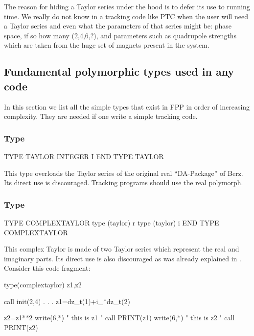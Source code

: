\documentclass[english,12pt,article]{article} %
\begin{document}
The reason for hiding a Taylor series under the hood is to defer its use to running time. We really do not know in a tracking code like PTC when the user will need a Taylor series and even what the parameters of that series might be: phase space, if so how many (2,4,6,?), and parameters such as quadrupole strengths which are taken from the huge set of magnets present in the system.


\subsection{Fundamental polymorphic types used in any code}\label{sec:funtype}

In this section we list all the simple types that exist in FPP in order of increasing complexity. They are needed if one write a simple tracking code.

\subsubsection{Type  \protect{}}

\begin{example}
  TYPE TAYLOR
     INTEGER I   
  END TYPE TAYLOR
\end{example}

This type overloads the Taylor series of the original real ``DA-Package'' of Berz. Its direct use is discouraged. Tracking programs should use the real polymorph.

\subsubsection{Type \protect{}}\label{sec:complextaylor}

\begin{example}
  TYPE COMPLEXTAYLOR
     type (taylor) r
     type (taylor) i
  END TYPE COMPLEXTAYLOR
\end{example}

This complex Taylor is made of two Taylor series which represent the real and imaginary parts. Its direct use is also  discouraged as was already explained in  .  Consider this code fragment:



\begin{code}
    type(complextaylor) z1,z2
 
    call init(2,4)
    .
    .
    .
    z1=dz_t(1)+i_*dz_t(2)

    z2=z1**2
   write(6,*) " this is z1 "
   call PRINT(z1)   
   write(6,*) " this is z2 "
   call PRINT(z2)	
\end{code}
\end{document}
